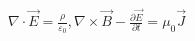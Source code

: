 \documentclass[preview]{standalone}
\begin{document}
\begin{align*}
\nabla \cdot \vec{E} = \frac{\rho}{\varepsilon_0},  \nabla \times \vec{B} - \frac{\partial \vec{E}}{\partial t} = \mu_0\vec{J}
\end{align*}
\end{document}
